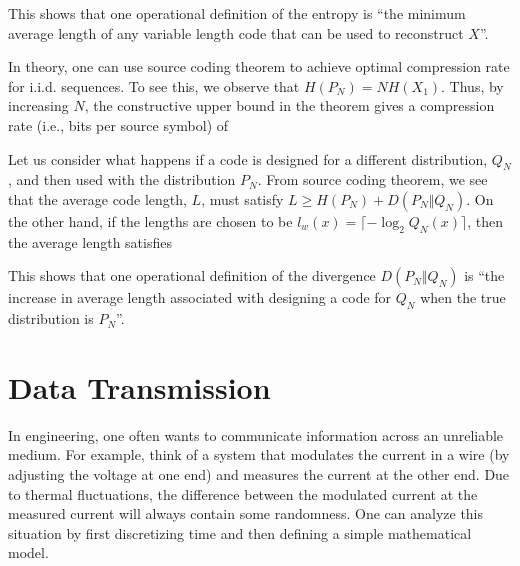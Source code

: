 \documentclass[letterpaper,10pt,english]{article}
\begin{document}
\begin{rem}
This shows that one operational definition of the entropy is ``the minimum average length of any variable length code that can be used to reconstruct $X$''. 
\end{rem} 
\begin{rem}
In theory, one can use source coding theorem to achieve optimal compression rate for i.i.d. sequences. 
To see this, we observe that $H(P_N) = NH(X_1)$. 
Thus, by increasing $N$, the constructive upper bound in the theorem gives a compression rate (i.e., bits per source symbol) of
\end{rem} 

\begin{shaded*}\begin{exmp} 
Let us consider what happens if a code is designed for a different distribution, $Q_N$, and then used with the distribution $P_N$. From source coding theorem, we see that the average code length, $L$, must satisfy $L \ge H(P_N ) + D (P_N \Vert Q_N)$. 
On the other hand, if the lengths are chosen to be $l_w (x) = \lceil -\log_2 Q_N (x)\rceil$, 
then the average length satisfies 
\end{exmp}\end{shaded*} 
\begin{rem}
This shows that one operational definition of the divergence $D (P_N \Vert Q_N )$ is ``the increase in average length associated with designing a code for $Q_N$ when the true distribution is $P_N$''.
\end{rem}  
  
\section{Data Transmission}

In engineering, one often wants to communicate information across an unreliable medium. 
For example, think of a system that modulates the current in a wire (by adjusting the voltage at one end) and measures the current at the other end. 
Due to thermal fluctuations, the difference between the modulated current at the measured current will always contain some randomness. 
One can analyze this situation by first discretizing time and then defining a simple mathematical model. 
\end{document}
